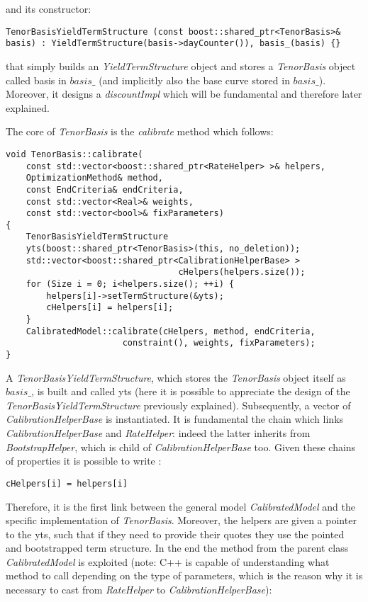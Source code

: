 and  its constructor:

\begin{lstlisting}
TenorBasisYieldTermStructure (const boost::shared_ptr<TenorBasis>& basis) : YieldTermStructure(basis->dayCounter()), basis_(basis) {}
\end{lstlisting} 

that simply builds an \textit{YieldTermStructure} object and stores a \textit{TenorBasis} object called basis in $basis\_$ (and implicitly also the base curve stored in $basis\_$). Moreover, it designs a \textit{discountImpl} which will be fundamental and therefore later explained.


The core of \textit{TenorBasis} is the \textit{calibrate} method which follows:

\begin{lstlisting}
void TenorBasis::calibrate(
    const std::vector<boost::shared_ptr<RateHelper> >& helpers,
    OptimizationMethod& method,
    const EndCriteria& endCriteria,
    const std::vector<Real>& weights,
    const std::vector<bool>& fixParameters) 
{
    TenorBasisYieldTermStructure 
    yts(boost::shared_ptr<TenorBasis>(this, no_deletion));
    std::vector<boost::shared_ptr<CalibrationHelperBase> > 
                                  cHelpers(helpers.size());
    for (Size i = 0; i<helpers.size(); ++i) {
        helpers[i]->setTermStructure(&yts);
        cHelpers[i] = helpers[i];
    }
    CalibratedModel::calibrate(cHelpers, method, endCriteria,
                       constraint(), weights, fixParameters);
}
\end{lstlisting} 

A \textit{TenorBasisYieldTermStructure}, which stores the \textit{TenorBasis} object itself as $basis\_$, is built and called yts (here it is possible to appreciate the design of the \textit{TenorBasisYieldTermStructure} previously explained). 
Subsequently, a vector of \textit{CalibrationHelperBase} is instantiated. It is fundamental the chain which links \textit{CalibrationHelperBase} and \textit{RateHelper}: indeed the latter inherits from \textit{BootstrapHelper}, which is child of \textit{CalibrationHelperBase} too. Given these chains of properties it is possible to write :
\begin{lstlisting}
cHelpers[i] = helpers[i]
\end{lstlisting}

Therefore, it is the first link between the general model \textit{CalibratedModel} and the specific implementation of \textit{TenorBasis}.
Moreover, the helpers are given a pointer to the yts, such that if they need to provide their quotes they use the pointed and bootstrapped term structure.
In the end the method from the parent class \textit{CalibratedModel} is exploited (note: C++ is capable of understanding what method to call depending on the type of parameters, which is the reason why it is necessary to cast from \textit{RateHelper} to \textit{CalibrationHelperBase}):

